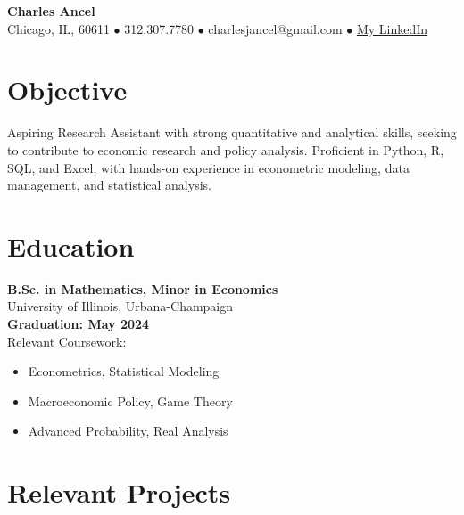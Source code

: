 \documentclass[10pt]{article}
\begin{document}
\begin{center}
{\Large\textbf{Charles Ancel}}\\
\vspace{5pt}
\small{Chicago, IL, 60611 \(\bullet\) 312.307.7780 \(\bullet\) charlesjancel@gmail.com \(\bullet\) \href{https://www.linkedin.com/in/charles-j-ancel/}{My LinkedIn}}
\end{center}

\vspace{-10pt}
\section*{Objective}
\vspace{0pt}
Aspiring Research Assistant with strong quantitative and analytical skills, seeking to contribute to economic research and policy analysis. Proficient in Python, R, SQL, and Excel, with hands-on experience in econometric modeling, data management, and statistical analysis.

\vspace{-10pt}
\section*{Education}
\vspace{0pt}
\begin{multicols}{2}
\textbf{B.Sc. in Mathematics, Minor in Economics} \\
University of Illinois, Urbana-Champaign \\
\textbf{Graduation: May 2024} \\
Relevant Coursework:
\begin{itemize}[noitemsep,nosep]
    \item Econometrics, Statistical Modeling
    \item Macroeconomic Policy, Game Theory
    \item Advanced Probability, Real Analysis
\end{itemize}
\end{multicols}

\vspace{-15pt}
\section*{Relevant Projects}
\vspace{0pt}
\end{document}
